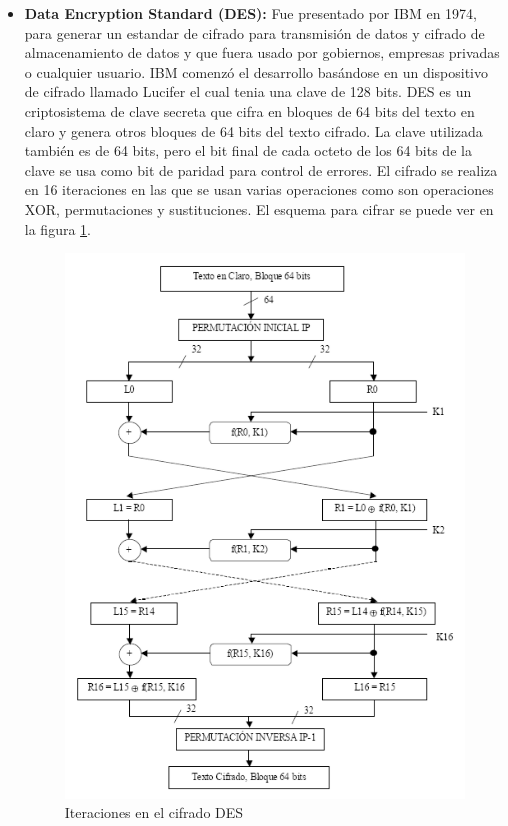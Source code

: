 \begin{itemize}

	\item \textbf{Data Encryption Standard (DES):} Fue presentado por IBM en 1974, para generar un estandar de cifrado para transmisión de datos y cifrado de almacenamiento de datos y que fuera usado por gobiernos, empresas privadas o cualquier usuario. IBM comenzó el desarrollo basándose en un dispositivo de cifrado llamado Lucifer el cual tenia una clave de 128 bits. DES es un criptosistema de clave secreta que cifra en bloques de 64 bits del texto en claro y genera otros bloques de 64 bits del texto cifrado. La clave utilizada también es de 64 bits, pero el bit final de cada octeto de los 64 bits de la clave se usa como bit de paridad para control de errores. El cifrado se realiza en 16 iteraciones en las que se usan varias operaciones como son operaciones XOR, permutaciones y sustituciones. El esquema para cifrar se puede ver en la figura \ref{fig:cifradoDes}.
	
\begin{figure}
  \centering
    \includegraphics{./ConocimientosPrevios/imagenes/cifradoDes.png}
  \caption{Iteraciones en el cifrado DES}
  \label{fig:cifradoDes}
\end{figure}


\end{itemize}
